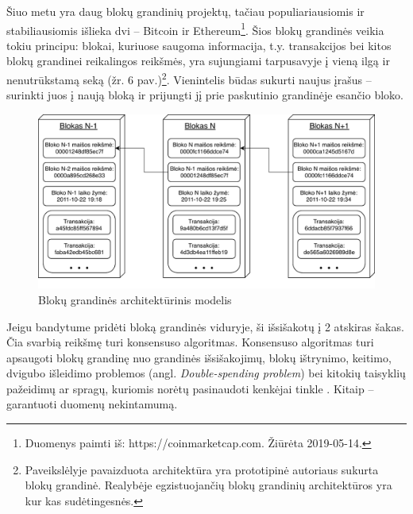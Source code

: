 Šiuo metu yra daug blokų grandinių projektų, tačiau populiariausiomis ir stabiliausiomis išlieka dvi – Bitcoin ir Ethereum\footnote{Duomenys paimti iš: https://coinmarketcap.com. Žiūrėta 2019-05-14.}. Šios blokų grandinės veikia tokiu principu: blokai, kuriuose saugoma informacija, t.y. transakcijos bei kitos blokų grandinei reikalingos reikšmės, yra sujungiami tarpusavyje į vieną ilgą ir nenutrūkstamą seką (žr. 6 pav.)\footnote{Paveikslėlyje pavaizduota architektūra yra prototipinė autoriaus sukurta blokų grandinė. Realybėje egzistuojančių blokų grandinių architektūros yra kur kas sudėtingesnės.}. Vienintelis būdas sukurti naujus įrašus – surinkti juos į naują bloką ir prijungti jį prie paskutinio grandinėje esančio bloko.

\begin{figure}[H]
    \centering
    \includegraphics[scale=0.85]{images/block-chain-architecture}
    \caption{Blokų grandinės architektūrinis modelis}
\end{figure}





Jeigu bandytume pridėti bloką grandinės viduryje, ši išsišakotų į 2 atskiras šakas. Čia svarbią reikšmę turi konsensuso algoritmas. Konsensuso algoritmas turi apsaugoti blokų grandinę nuo grandinės išsišakojimų, blokų ištrynimo, keitimo, dvigubo išleidimo problemos (angl. \textit{Double-spending problem}) bei kitokių taisyklių pažeidimų ar spragų, kuriomis norėtų pasinaudoti kenkėjai tinkle \cite{baliga2017understanding}. Kitaip – garantuoti duomenų nekintamumą.

